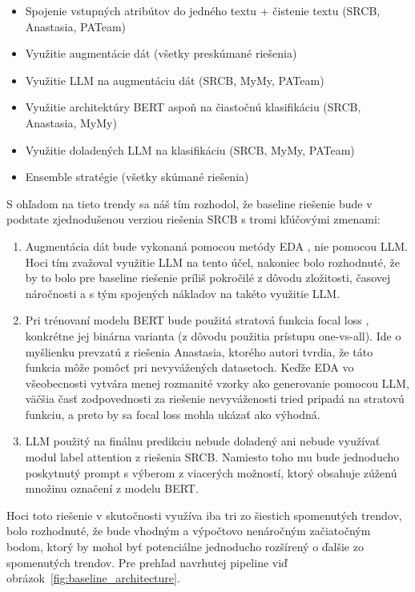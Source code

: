 \begin{itemize}
    \item Spojenie vstupných atribútov do jedného textu + čistenie textu (SRCB, Anastasia, PATeam)
    \item Využitie augmentácie dát (všetky preskúmané riešenia)
    \item Využitie LLM na augmentáciu dát (SRCB, MyMy, PATeam)
    \item Využitie architektúry BERT aspoň na čiastočnú klasifikáciu (SRCB, Anastasia, MyMy)
    \item Využitie doladených LLM na klasifikáciu (SRCB, MyMy, PATeam)
    \item Ensemble stratégie (všetky skúmané riešenia)
\end{itemize}

S ohľadom na tieto trendy sa náš tím rozhodol, že baseline riešenie bude v podstate zjednodušenou verziou riešenia SRCB s tromi kľúčovými zmenami:

\begin{enumerate}
    \item Augmentácia dát bude vykonaná pomocou metódy EDA \cite{wei2019eda}, nie pomocou LLM. Hoci tím zvažoval využitie LLM na tento účel, nakoniec bolo rozhodnuté, že by to bolo pre baseline riešenie príliš pokročilé z dôvodu zložitosti, časovej náročnosti a s tým spojených nákladov na takéto využitie LLM.
    
    \item Pri trénovaní modelu BERT bude použitá stratová funkcia focal loss \cite{lin2017focal}, konkrétne jej binárna varianta (z dôvodu použitia prístupu one-vs-all). Ide o myšlienku prevzatú z riešenia Anastasia, ktorého autori tvrdia, že táto funkcia môže pomôcť pri nevyvážených datasetoch. Keďže EDA vo všeobecnosti vytvára menej rozmanité vzorky ako generovanie pomocou LLM, väčšia časť zodpovednosti za riešenie nevyváženosti tried pripadá na stratovú funkciu, a preto by sa focal loss mohla ukázať ako výhodná.
    
    \item LLM použitý na finálnu predikciu nebude doladený ani nebude využívať modul label attention z riešenia SRCB. Namiesto toho mu bude jednoducho poskytnutý prompt s výberom z viacerých možností, ktorý obsahuje zúženú množinu označení z modelu BERT.
\end{enumerate}

Hoci toto riešenie v skutočnosti využíva iba tri zo šiestich spomenutých trendov, bolo rozhodnuté, že bude vhodným a výpočtovo nenáročným začiatočným bodom, ktorý by mohol byť potenciálne jednoducho rozšírený o ďalšie zo spomenutých trendov. Pre prehľad navrhutej pipeline viď obrázok~\ref{fig:baseline_architecture}.
 
